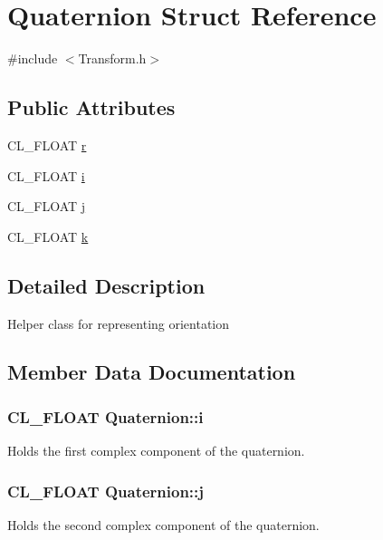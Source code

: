 \hypertarget{struct_quaternion}{}\section{Quaternion Struct Reference}
\label{struct_quaternion}


{\ttfamily \#include $<$Transform.\+h$>$}

\subsection*{Public Attributes}
\begin{DoxyCompactItemize}
\item 
C\+L\+\_\+\+F\+L\+O\+AT \hyperlink{struct_quaternion_ae01fc1079dd08eb5d439540e1af277e7}{r}
\item 
C\+L\+\_\+\+F\+L\+O\+AT \hyperlink{struct_quaternion_a009b8d0f303bd0224af3a963a2da9a34}{i}
\item 
C\+L\+\_\+\+F\+L\+O\+AT \hyperlink{struct_quaternion_a8d22eacc9d29338e0174fbd359427127}{j}
\item 
C\+L\+\_\+\+F\+L\+O\+AT \hyperlink{struct_quaternion_afcd8190c91b99d7b267860a6aa2c5bce}{k}
\end{DoxyCompactItemize}


\subsection{Detailed Description}
Helper class for representing orientation 

\subsection{Member Data Documentation}
\subsubsection[{\texorpdfstring{i}{i}}]{\setlength{\rightskip}{0pt plus 5cm}C\+L\+\_\+\+F\+L\+O\+AT Quaternion\+::i}\hypertarget{struct_quaternion_a009b8d0f303bd0224af3a963a2da9a34}{}\label{struct_quaternion_a009b8d0f303bd0224af3a963a2da9a34}
Holds the first complex component of the quaternion. 
\subsubsection[{\texorpdfstring{j}{j}}]{\setlength{\rightskip}{0pt plus 5cm}C\+L\+\_\+\+F\+L\+O\+AT Quaternion\+::j}\hypertarget{struct_quaternion_a8d22eacc9d29338e0174fbd359427127}{}\label{struct_quaternion_a8d22eacc9d29338e0174fbd359427127}
Holds the second complex component of the quaternion. 
